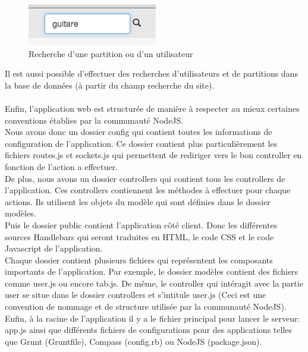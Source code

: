 \begin{figure}[H]
\centering
\includegraphics[scale=0.5]{rechercheWeb}
\caption{Recherche d'une partition ou d'un utilisateur}
\end{figure}
Il est aussi possible d'effectuer des recherches d'utilisateurs et de partitions dans la base de données (à partir du champ recherche du site).
\paragraph{}
Enfin, l'application web est structurée de manière à respecter au mieux certaines conventions établies par la communauté NodeJS. \\
Nous avons donc un dossier config qui contient toutes les informations de configuration de l'application. Ce dossier contient plus particulièrement les fichiers routes.js et sockets.js qui permettent de rediriger vers le bon controller en fonction de l'action a effectuer. \\
De plus, nous avons un dossier controllers qui contient tous les controllers de l'application. Ces controllers contiennent les méthodes à effectuer pour chaque actions. Ils utilisent les objets du modèle qui sont définies dans le dossier modèles. \\
Puis le dossier public contient l'application côté client. Donc les différentes sources Handlebars qui seront traduites en HTML, le code CSS et le code Javascript de l'application. \\
Chaque dossier contient plusieurs fichiers qui représentent les composants importants de l'application. Par exemple, le dossier modèles contient des fichiers comme user.js ou encore tab.js. De même, le controller qui intéragit avec la partie user se situe dans le dossier controllers et s'intitule user.js (Ceci est une convention de nommage et de structure utilisée par la communauté NodeJS). \\
Enfin, à la racine de l'application il y a le fichier principal pour lancer le serveur: app.js ainsi que différents fichiers de configurations pour des applications telles que Grunt (Gruntfile), Compass (config.rb) ou NodeJS (package.json). \\

